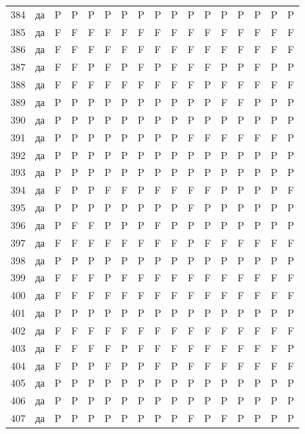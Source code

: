 \begin{table}[p]
\begin{tabular*}{\textwidth}{@{\extracolsep{\fill}}rcccccccccccccccc}
384 & да & P & P & P & P & P & P & P & P & P & P & P & P & P & P & P\\
385 & да & F & F & F & F & F & F & F & F & F & F & F & F & F & F & F\\
386 & да & F & F & F & F & F & F & F & F & F & F & F & F & F & F & F\\
387 & да & F & F & P & F & P & F & P & F & F & F & P & P & F & P & P\\
388 & да & F & F & F & F & F & F & F & F & F & P & F & F & F & F & F\\
389 & да & P & P & P & P & P & P & P & P & P & P & F & F & P & P & P\\
390 & да & P & P & P & P & P & P & P & P & P & P & P & P & P & P & P\\
391 & да & P & P & P & P & P & P & P & P & F & F & F & F & F & F & P\\
392 & да & P & P & P & P & P & P & P & P & P & P & P & P & P & P & P\\
393 & да & P & P & P & P & P & P & P & P & P & P & P & P & P & P & P\\
394 & да & F & P & P & F & F & P & F & F & F & F & P & P & P & P & F\\
395 & да & P & P & P & P & P & P & P & P & F & P & P & P & P & P & P\\
396 & да & P & F & F & P & P & P & F & P & P & P & P & P & P & P & P\\
397 & да & F & F & F & F & F & F & F & F & P & F & F & F & F & F & F\\
398 & да & P & P & P & P & P & P & P & P & P & P & P & P & P & P & P\\
399 & да & F & F & F & P & F & F & F & F & F & F & F & F & F & F & F\\
400 & да & F & F & F & F & F & F & F & F & F & F & F & F & F & F & F\\
401 & да & P & P & P & P & P & P & P & P & P & P & P & P & P & P & P\\
402 & да & F & F & F & F & F & F & F & F & F & F & F & F & F & F & F\\
403 & да & F & F & F & F & P & F & F & F & F & F & F & F & F & F & P\\
404 & да & F & P & P & F & P & P & F & P & F & F & F & F & F & F & F\\
405 & да & P & P & P & P & P & P & P & P & P & P & P & P & P & P & P\\
406 & да & P & P & P & P & P & P & P & P & P & P & P & P & P & P & P\\
407 & да & P & P & P & P & P & P & P & P & F & P & F & P & P & P & P\\
\bottomrule\end{tabular*}\end{table}
\clearpage

